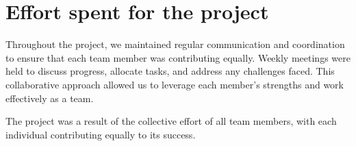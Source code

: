 \section{Effort spent for the project}

Throughout the project, we maintained regular communication and coordination to ensure that each team member was contributing equally. Weekly meetings were held to discuss progress, allocate tasks, and address any challenges faced. This collaborative approach allowed us to leverage each member's strengths and work effectively as a team.

The project was a result of the collective effort of all team members, with each individual contributing equally to its success.